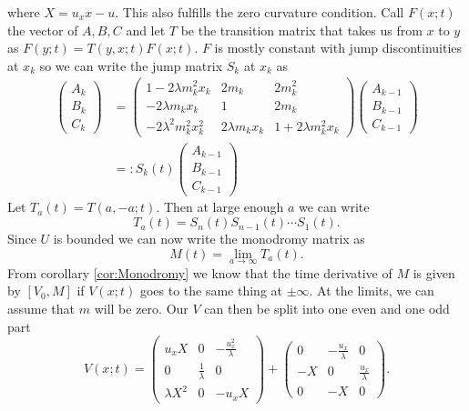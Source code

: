 \documentclass[english,master]{liumaiex}
\theoremstyle{plain}
\theoremstyle{definition}
\begin{document}
where $X = u_x x - u$. This also fulfills the zero curvature condition. Call $F(x;t)$ the vector of $A, B, C$ and let $T$ be the transition matrix that takes us from $x$ to $y$ as $F(y;t) = T(y,x;t)F(x;t)$. $F$ is mostly constant with jump discontinuities at $x_k$ so we can write the jump matrix $S_k$ at $x_k$ as
\begin{equation}
\begin{aligned}
\begin{pmatrix} A_k \\ B_k \\ C_k \end{pmatrix} &= 
\begin{pmatrix}
	1 - 2\lambda m_k^2 x_k & 2m_k & 2m_k^2 \\
	-2\lambda m_k x_k & 1 & 2m_k \\
	-2\lambda^2 m_k^2 x_k^2 & 2\lambda m_k x_k & 1 + 2\lambda m_k^2 x_k
\end{pmatrix}
\begin{pmatrix} A_{k-1} \\ B_{k-1} \\ C_{k-1} \end{pmatrix} \\
&=: S_k(t) 
\begin{pmatrix} A_{k-1} \\ B_{k-1} \\ C_{k-1} \end{pmatrix}
\end{aligned}
\end{equation}
Let $T_a(t) = T(a,-a;t)$. Then at large enough $a$ we can write 
\begin{equation}
	T_a(t) = S_n(t)S_{n-1}(t) \cdots S_1(t).
\end{equation}
Since $U$ is bounded we can now write the monodromy matrix as
\begin{equation}
	M(t) = \lim_{a \rightarrow \infty} T_a(t).
\end{equation}
From corollary \ref{cor:Monodromy} we know that the time derivative of $M$ is given by $[V_0, M]$ if $V(x;t)$ goes to the same thing at $\pm \infty$. At the limits, we can assume that $m$ will be zero. Our $V$ can then be split into one even and one odd part
\begin{equation}
	V(x;t) =
\begin{pmatrix}
	u_x X & 0 & -\frac{u_x^2}{\lambda} \\
	0 & \frac{1}{\lambda} & 0 \\
	\lambda X^2 & 0 & -u_x X
\end{pmatrix} +
\begin{pmatrix}
	0  & -\frac{u_x}{\lambda} & 0 \\
	-X & 0 & \frac{u_x}{\lambda} \\
	0 & -X & 0
\end{pmatrix}.
\end{equation}
\end{document}
